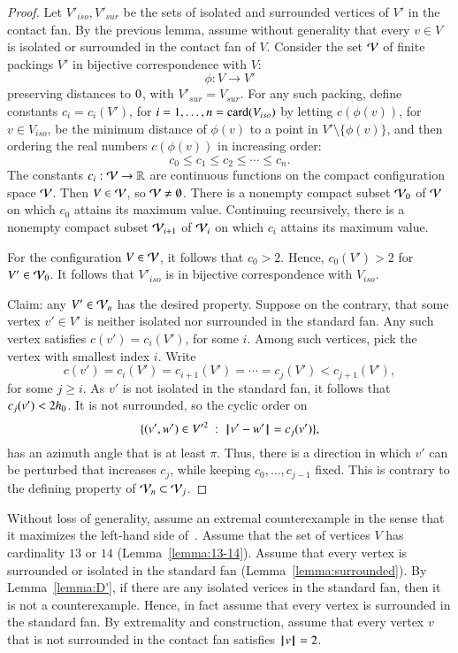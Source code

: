 \begin{proof}  
Let $V'_{iso},V'_{sur}$ be the
sets of isolated and surrounded vertices of $V'$ in the contact
fan.
By the previous lemma,  assume
without generality that every $v\in V$ is isolated
or surrounded in the contact fan of $V$.    
Consider the set ${\mathcal V}$ of finite
packings $V'$ in bijective correspondence with $V$:
$$
\phi:V\to V'
$$
preserving distances to $0$, with $V'_{sur}=V_{sur}$.
For any such packing, define constants $c_i=c_i(V')$,
for $i=1,\ldots,n={\operatorname{card}}(V_{iso})$ by letting 
$c(\phi(v))$, for $v\in V_{iso}$, 
be the minimum distance of $\phi(v)$ to a point
in $V'\setminus \{\phi(v)\}$, and then ordering the real numbers $c(\phi(v))$ in increasing order:
$$
c_0 \le c_1 \le c_2 \le \cdots \le c_n.
$$
The constants $c_i:{\mathcal V}\to\mathbb{R}$ are continuous functions on the compact configuration space ${\mathcal V}$.
Then $V\in {\mathcal V}$, so ${\mathcal V}\ne\emptyset$.
There is a nonempty 
compact subset ${\mathcal V}_0$ of ${\mathcal V}$ on which
$c_0$ attains its maximum value. Continuing recursively,
there is a nonempty compact subset ${\mathcal V}_{i+1}$ of
${\mathcal V}_{i}$ on which $c_i$ attains its maximum value.

For the configuration $V\in {\mathcal V}$, it follows that $c_0 >2$.
Hence, $c_0(V')>2$ for $V'\in{\mathcal V}_0$.  It follows
that $V'_{iso}$ is in bijective correspondence with
$V_{iso}$.

Claim:  any $V'\in {\mathcal V}_n$ has the desired property.
Suppose on the contrary, that some vertex $v'\in V'$
is neither isolated nor surrounded in the standard fan.  
Any such vertex satisfies $c(v')=c_i(V')$, for some $i$.
Among such vertices, pick the vertex with smallest index
$i$.  Write 
$$
c(v') = c_i(V') = c_{i+1}(V') =\cdots= c_j(V') < c_{j+1}(V'),
$$
for some $j\ge i$.  As $v'$ is not isolated in the
standard fan, it follows that $c_j(v') < 2{h_0}$.  It is not surrounded,
so the cyclic order on
$$
\{(v',w')\in V'^2 \ :\  {\hskip0.1em|\hskip-0.15em|\hskip0.1em}v' - w'{\hskip0.1em|\hskip-0.15em|\hskip0.1em} = c_j(v')\},
$$
has an azimuth angle that is at least $\pi$.
Thus, there is a direction in which $v'$ can be perturbed
that increases $c_j$, while keeping $c_0,\ldots,c_{j-1}$
fixed.  This is contrary to the defining property of
${\mathcal V}_n\subset{\mathcal V}_j$.
\end{proof}


Without loss of generality,
assume an extremal counterexample in the sense that it maximizes the left-hand side of~.  Assume that the set of vertices $V$ has cardinality $13$ or $14$ (Lemma~\ref{lemma:13-14}). Assume that every vertex is surrounded or isolated in the standard fan (Lemma~\ref{lemma:surrounded}).  By Lemma~\ref{lemma:D'}, if there are any isolated verices in the standard fan, then it is not a counterexample.  Hence, in fact assume that every vertex is surrounded in the standard fan. By extremality and construction,  assume that every vertex $v$ that is not surrounded in the contact fan satisfies ${{\hskip0.1em|\hskip-0.15em|\hskip0.1em}v{\hskip0.1em|\hskip-0.15em|\hskip0.1em}}=2$.



